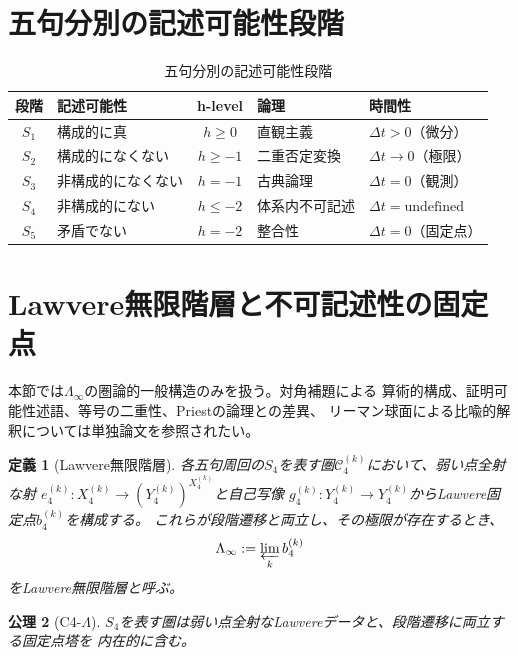 \documentclass[11pt,a4paper]{ltjsarticle}
\newtheorem{definition}{定義}[section]
\newtheorem{axiom}[definition]{公理}
\theoremstyle{remark}
\newcommand{\dt}{\Delta t}
\newcommand{\LawvereInfinity}{\Lambda_\infty}
\begin{document}
\section{五句分別の記述可能性段階}

\begin{table}[htbp]
\centering
\caption{五句分別の記述可能性段階}
\label{tab:stages-perspective}
\small
\begin{tabularx}{\textwidth}{@{}c >{\raggedright\arraybackslash}X c l >{\raggedright\arraybackslash}X@{}}
\toprule
段階 & 記述可能性 & h-level & 論理 & 時間性 \\
\midrule
$S_1$ & 構成的に真 & $h\geq0$ & 直観主義 & $\dt>0$（微分） \\
$S_2$ & 構成的になくない & $h\geq-1$ & 二重否定変換 & $\dt\to0$（極限） \\
$S_3$ & 非構成的になくない & $h=-1$ & 古典論理 & $\dt=0$（観測） \\
$S_4$ & 非構成的にない & $h\leq-2$ & 体系内不可記述 & $\dt=\mathrm{undefined}$ \\
$S_5$ & 矛盾でない & $h=-2$ & 整合性 & $\dt=0$（固定点） \\
\bottomrule
\end{tabularx}
\end{table}

\section{Lawvere無限階層と不可記述性の固定点}
\label{sec:lambda-perspective}

本節では$\LawvereInfinity$の圏論的一般構造のみを扱う。対角補題による
算術的構成、証明可能性述語、等号の二重性、Priestの論理との差異、
リーマン球面による比喩的解釈については単独論文\cite{ChibaLambda2026}を参照されたい。

\begin{definition}[Lawvere無限階層]
各五句周回の$S_4$を表す圏$\mathcal{C}_4^{(k)}$において、弱い点全射な射
$e_4^{(k)}:X_4^{(k)}\to(Y_4^{(k)})^{X_4^{(k)}}$と自己写像
$g_4^{(k)}:Y_4^{(k)}\to Y_4^{(k)}$からLawvere固定点$b_4^{(k)}$を構成する。
これらが段階遷移と両立し、その極限が存在するとき、
\[
 \LawvereInfinity:=\varprojlim_k b_4^{(k)}
\]
をLawvere無限階層と呼ぶ。
\end{definition}

\begin{axiom}[C4-$\Lambda$]
$S_4$を表す圏は弱い点全射なLawvereデータと、段階遷移に両立する固定点塔を
内在的に含む。
\end{axiom}
\end{document}
